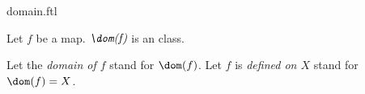 \documentclass{naproche-library}
\begin{document}
\begin{smodule}[title=The Domain of a Map]{domain.ftl}



\begin{fakeforthel}
  \begin{signature}
    Let $f$ be a map.
    $\emph{\dom(f)}$ is an class.
  \end{signature}
\end{fakeforthel}

\begin{forthel}
  \begin{convention}
    Let the \emph{domain of $f$} stand for $\dom(f)$.
    Let $f$ is \emph{defined on $X$} stand for $\dom(f) = X$.
  \end{convention}
\end{forthel}

\end{smodule}
\end{document}
